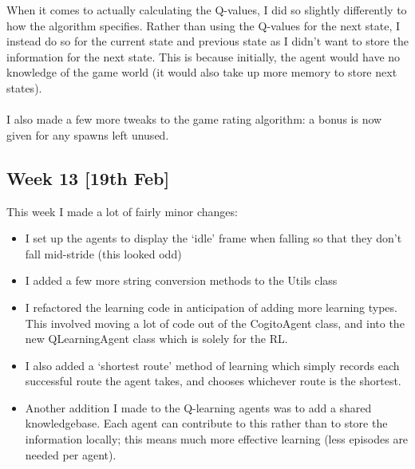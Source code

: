 \documentclass[a4paper,oneside]{report}
\begin{document}
When it comes to actually calculating the Q-values, I did so slightly differently to how the algorithm specifies. Rather than using the Q-values for the next state, I instead do so for the current state and previous state as I didn't want to store the information for the next state. This is because initially, the agent would have no knowledge of the game world (it would also take up more memory to store next states).

\paragraph{} I also made a few more tweaks to the game rating algorithm: a bonus is now given for any spawns left unused.



\subsection{Week 13 [19th Feb]}

This week I made a lot of fairly minor changes:

\begin{itemize}

	\item I set up the agents to display the `idle' frame when falling so that they don't fall mid-stride (this looked odd)
	
	\item I added a few more string conversion methods to the Utils class
	
	\item I refactored the learning code in anticipation of adding more learning types. This involved moving a lot of code out of the CogitoAgent class, and into the new QLearningAgent class which is solely for the RL.
	
	\item I also added a `shortest route' method of learning which simply records each successful route the agent takes, and chooses whichever route is the shortest.
	
	\item Another addition I made to the Q-learning agents was to add a shared knowledgebase. Each agent can contribute to this rather than to store the information locally; this means much more effective learning (less episodes are needed per agent). 

\end{itemize}
\end{document}
